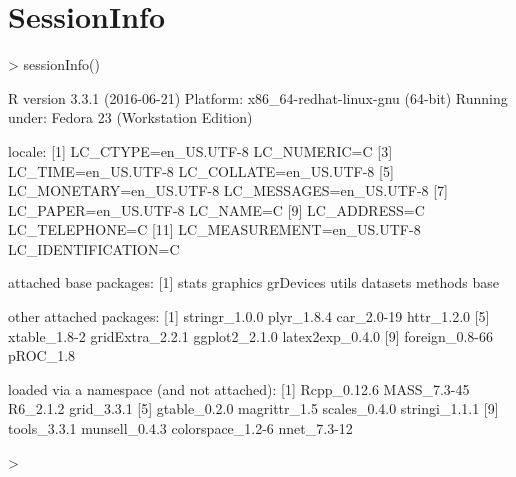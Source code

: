 \documentclass{article}
\begin{document}

\newpage
\section*{SessionInfo}

\begin{Schunk}
\begin{Sinput}
> sessionInfo()
\end{Sinput}
\begin{Soutput}
R version 3.3.1 (2016-06-21)
Platform: x86_64-redhat-linux-gnu (64-bit)
Running under: Fedora 23 (Workstation Edition)

locale:
 [1] LC_CTYPE=en_US.UTF-8       LC_NUMERIC=C              
 [3] LC_TIME=en_US.UTF-8        LC_COLLATE=en_US.UTF-8    
 [5] LC_MONETARY=en_US.UTF-8    LC_MESSAGES=en_US.UTF-8   
 [7] LC_PAPER=en_US.UTF-8       LC_NAME=C                 
 [9] LC_ADDRESS=C               LC_TELEPHONE=C            
[11] LC_MEASUREMENT=en_US.UTF-8 LC_IDENTIFICATION=C       

attached base packages:
[1] stats     graphics  grDevices utils     datasets  methods   base     

other attached packages:
 [1] stringr_1.0.0   plyr_1.8.4      car_2.0-19      httr_1.2.0     
 [5] xtable_1.8-2    gridExtra_2.2.1 ggplot2_2.1.0   latex2exp_0.4.0
 [9] foreign_0.8-66  pROC_1.8       

loaded via a namespace (and not attached):
 [1] Rcpp_0.12.6      MASS_7.3-45      R6_2.1.2         grid_3.3.1      
 [5] gtable_0.2.0     magrittr_1.5     scales_0.4.0     stringi_1.1.1   
 [9] tools_3.3.1      munsell_0.4.3    colorspace_1.2-6 nnet_7.3-12     
\end{Soutput}
\begin{Sinput}
> 
\end{Sinput}
\end{Schunk}
\end{document}
